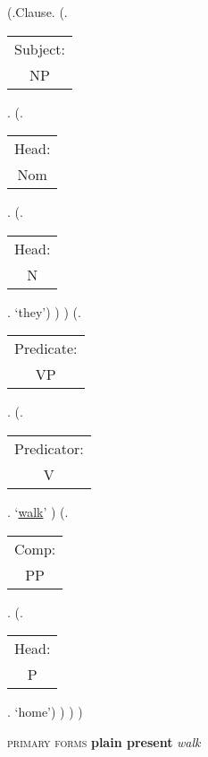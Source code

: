 \documentclass[12pt,letterpaper]{article}
\begin{document}
\begin{figure}
	\begin{center}
		\begin{parsetree}
			(.Clause.
			(.\begin{tabular}{c}Subject:\\NP\end{tabular}.  
			(.\begin{tabular}{c}Head:\\Nom\end{tabular}.
			(.\begin{tabular}{c}Head:\\N\end{tabular}. `they')
			)
			)
			(.\begin{tabular}{c}Predicate:\\VP\end{tabular}.
			(.\begin{tabular}{c}Predicator:\\V\end{tabular}.    `\underline{walk}' )
			(.\begin{tabular}{c}Comp:\\PP\end{tabular}. 
			(.\begin{tabular}{c}Head:\\P\end{tabular}. `home')
			)
			)
			)
			
		\end{parsetree}
		\hfill \break \hfill {} \textsc{primary forms} \textbf{plain present} \textit{walk}
	\end{center}
\end{figure}
\end{document}
